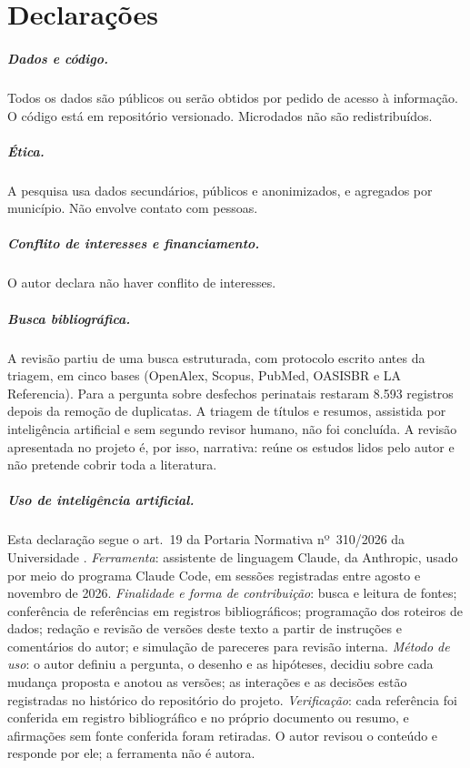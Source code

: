 \chapter{Declarações}
\label{ap:declaracoes}

\paragraph{Dados e código.} Todos os dados são públicos ou serão obtidos por
pedido de acesso à informação. O código está em repositório versionado.
Microdados não são redistribuídos.

\paragraph{Ética.} A pesquisa usa dados secundários, públicos e anonimizados, e
agregados por município. Não envolve contato com pessoas.

\paragraph{Conflito de interesses e financiamento.} O autor declara não haver
conflito de interesses. %

\paragraph{Busca bibliográfica.} A revisão partiu de uma busca estruturada,
com protocolo escrito antes da triagem, em cinco bases (OpenAlex, Scopus,
PubMed, OASISBR e LA Referencia). Para a pergunta sobre desfechos perinatais
restaram 8.593 registros depois da remoção de duplicatas. A triagem de títulos
e resumos, assistida por inteligência artificial e sem segundo revisor humano,
não foi concluída. A revisão apresentada no projeto é, por isso, narrativa:
reúne os estudos lidos pelo autor e não pretende cobrir toda a literatura.

\paragraph{Uso de inteligência artificial.} Esta declaração segue o art.~19 da
Portaria Normativa nº~310/2026 da Universidade \cite{ufes2026ia}.
\emph{Ferramenta}: assistente de linguagem Claude, da Anthropic, usado por meio
do programa Claude Code, em sessões registradas entre agosto e novembro de
2026. %
\emph{Finalidade e forma de contribuição}: busca e leitura de fontes;
conferência de referências em registros bibliográficos; programação dos
roteiros de dados; redação e revisão de versões deste texto a partir de
instruções e comentários do autor; e simulação de pareceres para revisão
interna. \emph{Método de uso}: o autor definiu a pergunta, o desenho e as
hipóteses, decidiu sobre cada mudança proposta e anotou as versões; as
interações e as decisões estão registradas no histórico do repositório do
projeto. \emph{Verificação}: cada referência foi conferida em registro
bibliográfico e no próprio documento ou resumo, e afirmações sem fonte
conferida foram retiradas. O autor revisou o conteúdo e responde por ele; a
ferramenta não é autora.
